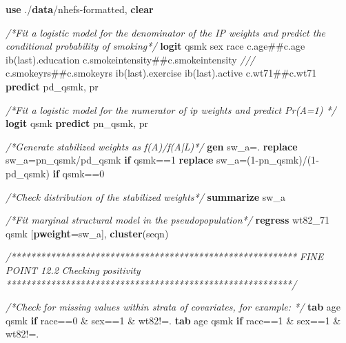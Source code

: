 \documentclass[
  10pt,
]{book}
\newenvironment{Shaded}{\begin{snugshade}}{\end{snugshade}}
\newcommand{\CommentTok}[1]{\textcolor[rgb]{0.56,0.35,0.01}{\textit{#1}}}
\newcommand{\FunctionTok}[1]{\textcolor[rgb]{0.00,0.00,0.00}{#1}}
\newcommand{\KeywordTok}[1]{\textcolor[rgb]{0.13,0.29,0.53}{\textbf{#1}}}
\newcommand{\NormalTok}[1]{#1}
\begin{document}
\begin{Shaded}
\begin{Highlighting}[]
\KeywordTok{use}\NormalTok{ ./}\KeywordTok{data}\NormalTok{/nhefs{-}formatted, }\KeywordTok{clear}

\CommentTok{/*Fit a logistic model for the denominator of the IP weights and predict the conditional probability of smoking*/} 
\KeywordTok{logit}\NormalTok{ qsmk sex race c.age\#\#c.age ib(}\FunctionTok{last}\NormalTok{).education c.smokeintensity\#\#c.smokeintensity }\CommentTok{///}
\NormalTok{c.smokeyrs\#\#c.smokeyrs ib(}\FunctionTok{last}\NormalTok{).exercise ib(}\FunctionTok{last}\NormalTok{).active c.wt71\#\#c.wt71  }
\KeywordTok{predict}\NormalTok{ pd\_qsmk, pr}

\CommentTok{/*Fit a logistic model for the numerator of ip weights and predict Pr(A=1) */} 
\KeywordTok{logit}\NormalTok{ qsmk }
\KeywordTok{predict}\NormalTok{ pn\_qsmk, pr}

\CommentTok{/*Generate stabilized weights as f(A)/f(A|L)*/}
\KeywordTok{gen}\NormalTok{ sw\_a=.}
\KeywordTok{replace}\NormalTok{ sw\_a=pn\_qsmk/pd\_qsmk }\KeywordTok{if}\NormalTok{ qsmk==1}
\KeywordTok{replace}\NormalTok{ sw\_a=(1{-}pn\_qsmk)/(1{-}pd\_qsmk) }\KeywordTok{if}\NormalTok{ qsmk==0}

\CommentTok{/*Check distribution of the stabilized weights*/}
\KeywordTok{summarize}\NormalTok{ sw\_a}

\CommentTok{/*Fit marginal structural model in the pseudopopulation*/}
\KeywordTok{regress}\NormalTok{ wt82\_71 qsmk [}\KeywordTok{pweight}\NormalTok{=sw\_a], }\KeywordTok{cluster}\NormalTok{(seqn) }

\CommentTok{/**********************************************************}
\CommentTok{FINE POINT 12.2}
\CommentTok{Checking positivity}
\CommentTok{**********************************************************/}

\CommentTok{/*Check for missing values within strata of covariates, for example: */}
\KeywordTok{tab}\NormalTok{ age qsmk }\KeywordTok{if}\NormalTok{ race==0 \& sex==1 \& wt82!=.}
\KeywordTok{tab}\NormalTok{ age qsmk }\KeywordTok{if}\NormalTok{ race==1 \& sex==1 \& wt82!=.}
\end{Highlighting}
\end{Shaded}
\end{document}
